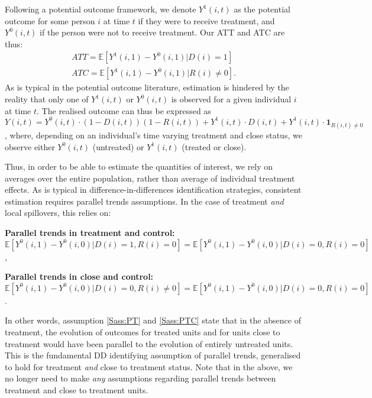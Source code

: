 Following a potential outcome framework, we denote $Y^1(i,t)$ as the potential
outcome for some person $i$ at time $t$ if they were to receive treatment, and
$Y^0(i,t)$ if the person were not to receive treatment.  Our ATT and ATC are
thus:
\begin{eqnarray}
\label{Seqn:estimATT}
ATT=\mathbb{E}[Y^1(i,1)-Y^0(i,1)|D(i)=1]\  \\
\label{Seqn:estimATC}
ATC=\mathbb{E}[Y^1(i,1)-Y^0(i,1)|R(i)\neq 0].
\end{eqnarray}
As is typical in the potential outcome literature, estimation is hindered by the
reality that only one of $Y^1(i,t)$ or $Y^0(i,t)$ is observed for a given 
individual $i$ at time $t$.  The realised outcome can thus be expressed as 
$Y(i,t)=Y^0(i,t)\cdot (1-D(i,t))(1-R(i,t))+Y^1(i,t)\cdot D(i,t)+Y^1(i,t)\cdot 
\mathbf{1}_{R(i,t)\neq 0}$, where, depending on an individual's time varying treatment and close
status, we observe either $Y^0(i,t)$ (untreated) or $Y^1(i,t)$ (treated or 
close).

Thus, in order to be able to estimate the quantities of interest, we rely on
averages over the entire population, rather than average of individual 
treatment effects.  As is typical in difference-in-differences identification
strategies,
consistent estimation requires parallel trends assumptions.  In the case of
treatment \emph{and} local spillovers, this relies on:

\begin{assumption}{1}{}
\label{Sass:PT}
\textbf{Parallel trends in treatment and control:} \\
$\mathbb{E}[Y^0(i,1)-Y^0(i,0)|D(i)=1,R(i)=0]=
\mathbb{E}[Y^0(i,1)-Y^0(i,0)|D(i)=0,R(i)=0]$,
\end{assumption}
\begin{assumption}{2}{}
\label{Sass:PTC}
\textbf{Parallel trends in close and control:} \\
$\mathbb{E}[Y^0(i,1)-Y^0(i,0)|D(i)=0,R(i)\neq 0]=
\mathbb{E}[Y^0(i,1)-Y^0(i,0)|D(i)=0,R(i)=0]$.
\end{assumption}

In other words, assumption \ref{Sass:PT}
and \ref{Sass:PTC} state that in the absence of treatment, the evolution
of outcomes for treated units and for units close to treatment would have
been parallel to the evolution of entirely untreated units.  This is the
fundamental DD identifying assumption of parallel trends, generalised to
hold for treatment \emph{and} close to treatment status.  Note that in
the above, we no longer need to make \emph{any} assumptions regarding
parallel trends between treatment and close to treatment units.

